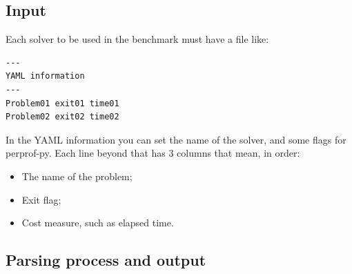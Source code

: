 \subsection*{Input}

    Each solver to be used in the benchmark must have a file like:

    \begin{verbatim}
---
YAML information
---
Problem01 exit01 time01
Problem02 exit02 time02
    \end{verbatim}

    In the YAML information you can set the name of the solver, and some
    flags for perprof-py.
    Each line beyond that has 3 columns that mean, in order:
    \begin{itemize}
      \item The name of the problem;
      \item Exit flag;
      \item Cost measure, such as elapsed time.
    \end{itemize}

\subsection*{Parsing process and output}


